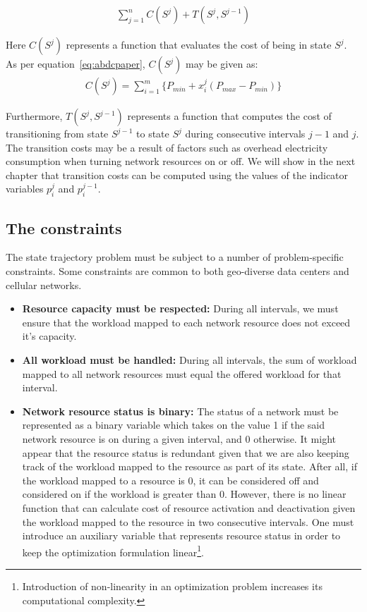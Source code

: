 \begin{align}
\sum_{j=1}^n C(S^j) + T(S^j, S^{j-1})
\end{align}

Here $C(S^j)$ represents a function that evaluates the cost of being in state $S^j$. As per equation~\ref{eq:abdcpaper}, $C(S^j)$ may be given as:
\begin{align}
C(S^j) = \sum_{i=1}^m \{ P_{min} + x_i^j (P_{max} - P_{min}) \}
\end{align}

Furthermore, $T(S^j,S^{j-1})$ represents a function that computes the cost of transitioning from state $S^{j-1}$ to state $S^j$ during consecutive intervals $j-1$ and $j$. The transition costs may be a result of factors such as overhead electricity consumption when turning network resources on or off. We will show in the next chapter that transition costs can be computed using the values of the indicator variables $p_i^j$ and $p_i^{j-1}$.

\subsection{The constraints}
\label{subsec:framework:constraints} %
The state trajectory problem must be subject to a number of problem-specific constraints. Some constraints are common to both geo-diverse data centers and cellular networks. 

\begin{itemize}
\item \textbf{Resource capacity must be respected:} During all intervals, we must ensure that the workload mapped to each network resource does not exceed it's capacity.
\item \textbf{All workload must be handled:} During all intervals, the sum of workload mapped to all network resources must equal the offered workload for that interval.
\item \textbf{Network resource status is binary:} The status of a network must be represented as a binary variable which takes on the value 1 if the said network resource is on during a given interval, and 0 otherwise. It might appear that the resource status is redundant given that we are also keeping track of the workload mapped to the resource as part of its state. After all, if the workload mapped to a resource is $0$, it can be considered off and considered on if the workload is greater than $0$. However, there is no linear function that can calculate cost of resource activation and deactivation given the workload mapped to the resource in two consecutive intervals. One must introduce an auxiliary variable that represents resource status in order to keep the optimization formulation linear\footnote{Introduction of non-linearity in an optimization problem increases its computational complexity.}. 
\end{itemize}


